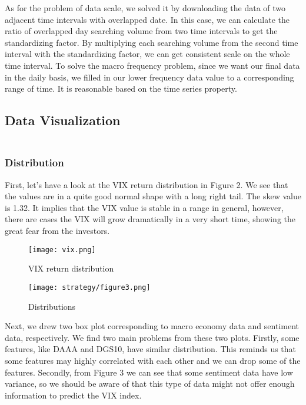 \documentclass[fleqn,10pt]{SelfArx} %
\begin{document}
\noindent
As for the problem of data scale, we solved it by downloading the data of two adjacent time intervals with overlapped date. In this case, we can calculate the ratio of overlapped day searching volume from two time intervals to get the standardizing factor. By multiplying each searching volume from the second time interval with the standardizing factor, we can get consistent scale on the whole time interval. To solve the macro frequency problem, since we want our final data in the daily basis, we filled in our lower frequency data value to a corresponding range of time. It is reasonable based on the time series property.

\subsection{Data Visualization}
\subsubsection*{\\Distribution}
First, let's have a look at the VIX return distribution in Figure 2. We see that the values are in a quite good normal shape with a long right tail. The skew value is 1.32. It implies that the VIX value is stable in a range in general, however, there are cases the VIX will grow dramatically in a very short time, showing the great fear from the investors.

\begin{figure}[ht]\centering %
\texttt{[image: vix.png]}
\caption{VIX return distribution}
\label{fig:view}
\end{figure}

\begin{figure}[ht]\centering %
\texttt{[image: strategy/figure3.png]}
\caption{Distributions}
\label{fig:view}
\end{figure}

\noindent
Next, we drew two box plot corresponding to macro economy data and sentiment data, respectively. We find two main problems from these two plots. Firstly, some features, like DAAA and DGS10, have similar distribution. This reminds us that some features may highly correlated with each other and we can drop some of the features. Secondly, from Figure 3 we can see that some sentiment data have low variance, so we should be aware of that this type of data might not offer enough information to predict the VIX index.\\
\end{document}
